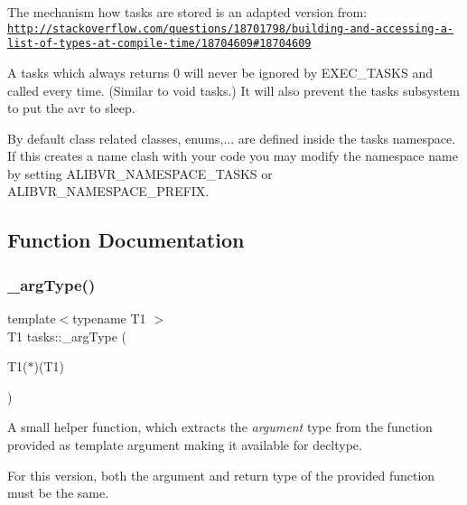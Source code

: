 The mechanism how tasks are stored is an adapted version from\+: \href{http://stackoverflow.com/questions/18701798/building-and-accessing-a-list-of-types-at-compile-time/18704609#18704609}{\tt http\+://stackoverflow.\+com/questions/18701798/building-\/and-\/accessing-\/a-\/list-\/of-\/types-\/at-\/compile-\/time/18704609\#18704609}

A tasks which always returns 0 will never be ignored by E\+X\+E\+C\+\_\+\+T\+A\+S\+KS and called every time. (Similar to void tasks.) It will also prevent the tasks subsystem to put the avr to sleep.

By default class related classes, enums,... are defined inside the {\ttfamily tasks} namespace. If this creates a name clash with your code you may modify the namespace name by setting A\+L\+I\+B\+V\+R\+\_\+\+N\+A\+M\+E\+S\+P\+A\+C\+E\+\_\+\+T\+A\+S\+KS or A\+L\+I\+B\+V\+R\+\_\+\+N\+A\+M\+E\+S\+P\+A\+C\+E\+\_\+\+P\+R\+E\+F\+IX. 

\subsection{Function Documentation}
\hypertarget{namespacetasks_ac4a797a86584958bef0b67616a38c8ae}{}\label{namespacetasks_ac4a797a86584958bef0b67616a38c8ae} 
\subsubsection{\texorpdfstring{\+\_\+arg\+Type()}{\_argType()}\hspace{0.1cm}{\footnotesize\ttfamily [1/2]}}
{\footnotesize\ttfamily template$<$typename T1 $>$ \\
T1 tasks\+::\+\_\+arg\+Type (\begin{DoxyParamCaption}\item[{T1($\ast$)(T1)}]{ }\end{DoxyParamCaption})}



A small helper function, which extracts the {\itshape argument} type from the function provided as template argument making it available for decltype. 

For this version, both the argument and return type of the provided function must be the same. \hypertarget{namespacetasks_a7950bab5a2847e4ea072b489e93855cb}{}\label{namespacetasks_a7950bab5a2847e4ea072b489e93855cb} 

